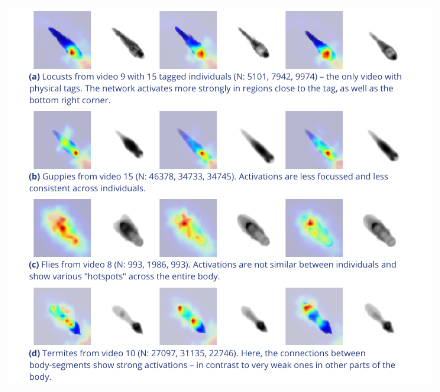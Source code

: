 \documentclass[9pt,lineno]{elife}
\newcommand{\videoref}[1]{video~\textit{\textbf{\ref{#1}}}}
\begin{document}
\begin{figure}[h]
\includegraphics[width=\textwidth]{fig_activations.pdf}


\end{figure}
\end{document}
